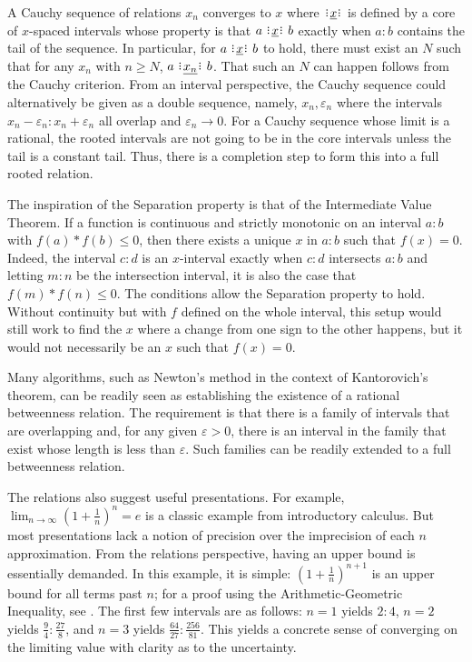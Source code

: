 \documentclass[12pt]{article}
\begin{document}
A Cauchy sequence of relations $x_n$ converges to $x$ where $\xrel$ is defined by a core of $x$-spaced intervals whose property is that $a \xrel b$ exactly when $a:b$ contains the tail of the sequence. In particular, for $a\xrel b$ to hold, there must exist an $N$ such that for any $x_n$ with $n \geq N$, $a \xrel[x_n] b$. That such an $N$ can happen follows from the Cauchy criterion. From an interval perspective, the Cauchy sequence could alternatively be given as a double sequence, namely, $x_n, \varepsilon_n$ where the intervals $x_n-\varepsilon_n : x_n + \varepsilon_n$  all overlap and $\varepsilon_n \to 0$. For a Cauchy sequence whose limit is a rational, the rooted intervals are not going to be in the core intervals unless the tail is a constant tail. Thus, there is a completion step to form this into a full rooted relation.


The inspiration of the Separation property is that of the Intermediate Value Theorem. If a function is continuous and strictly monotonic on an interval $a:b$ with $f(a)*f(b) \leq 0$, then there exists a unique $x$ in $a:b$ such that $f(x) = 0$. Indeed, the interval $c:d$ is an $x$-interval exactly when $c:d$ intersects $a:b$ and letting $m:n$ be the intersection interval, it is also the case that $f(m)*f(n) \leq 0$. The conditions allow the Separation property to hold. Without continuity but with $f$ defined on the whole interval, this setup would still work to find the $x$ where a change from one sign to the other  happens, but it would not necessarily be an $x$ such that $f(x) = 0$.

Many algorithms, such as Newton's method in the context of Kantorovich's theorem, can be readily seen as establishing the existence of a rational betweenness relation. The requirement is that there is a family of intervals that are overlapping and, for any given $\varepsilon >0$, there is an interval in the family that exist whose length is less than $\varepsilon$. Such families can be readily extended to a full betweenness relation. 

The relations also suggest useful presentations. For example, $\lim_{n \to \infty} (1+\frac{1}{n})^n = e$ is a classic example from introductory calculus. But most presentations lack a notion of precision over the imprecision of each $n$ approximation. From the relations perspective, having an upper bound is essentially demanded. In this example, it is simple: $(1 + \frac{1}{n})^{n+1}$ is an upper bound for all terms past $n$; for a proof using the Arithmetic-Geometric Inequality, see \cite{mend}. The first few intervals are as follows: $n=1$ yields $2:4$, $n=2$ yields $\frac{9}{4}:\frac{27}{8}$, and $n=3$ yields $\frac{64}{27}:\frac{256}{81}$. This yields a concrete sense of converging on the limiting  value with clarity as to the uncertainty. 
\end{document}
